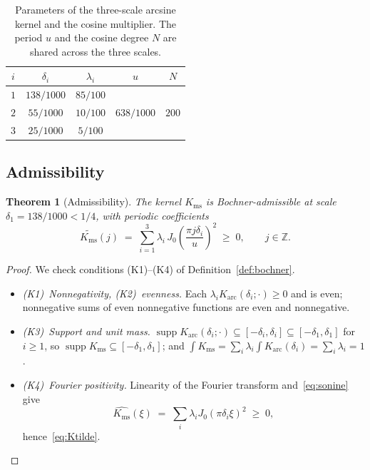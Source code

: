 \documentclass[11pt, letterpaper]{article}
\theoremstyle{paperplain}
\newtheorem{theorem}{Theorem}[section]
\theoremstyle{paperdef}
\newcommand{\Z}{\mathbb{Z}}
\newcommand{\supp}{\operatorname{supp}}
\newcommand{\Karc}{K_{\mathrm{arc}}}
\newcommand{\Kms}{K_{\mathrm{ms}}}
\begin{document}
\begin{table}[ht]
\centering
\begin{tabular}{ccccc}
  \toprule
  $i$ & $\delta_i$ & $\lambda_i$ & $u$ & $N$ \\
  \midrule
  $1$ & $138/1000$ & $85/100$ & \multirow{3}{*}{$638/1000$} & \multirow{3}{*}{$200$} \\
  $2$ & $55/1000$  & $10/100$ & & \\
  $3$ & $25/1000$  & $5/100$  & & \\
  \bottomrule
\end{tabular}
\caption[Parameters of the three-scale arcsine kernel and the cosine multiplier.]{Parameters of the three-scale arcsine kernel and the cosine
multiplier.  The period $u$ and the cosine degree $N$ are shared
across the three scales.}
\label{tab:kernel-params}
\end{table}

\subsection{Admissibility}\label{subsec:kernel-admissibility}

\begin{theorem}[Admissibility]
\label{thm:admissibility}
The kernel $\Kms$ is Bochner-admissible at scale
$\delta_1=138/1000<1/4$, with periodic coefficients
\begin{equation}\label{eq:Ktilde}
  \widetilde{\Kms}(j)
  \;=\;
  \sum_{i=1}^{3}\lambda_i\,
       J_0\!\left(\frac{\pi j\delta_i}{u}\right)^{\!2}
  \;\ge\; 0,
  \qquad j\in\Z.
\end{equation}
\end{theorem}

\begin{proof}
We check conditions (K1)--(K4) of Definition~\ref{def:bochner}.
\begin{itemize}[leftmargin=2em]
\item \emph{(K1)~Nonnegativity, (K2)~evenness.}  Each
  $\lambda_i\Karc(\delta_i;\cdot)\ge 0$ and is even; nonnegative sums
  of even nonnegative functions are even and nonnegative.
\item \emph{(K3)~Support and unit mass.}
  $\supp\Karc(\delta_i;\cdot)\subseteq
  [-\delta_i,\delta_i]\subseteq[-\delta_1,\delta_1]$ for $i\ge 1$, so
  $\supp\Kms\subseteq[-\delta_1,\delta_1]$; and
  $\int\Kms=\sum_i\lambda_i\int\Karc(\delta_i)=\sum_i\lambda_i=1$.
\item \emph{(K4)~Fourier positivity.}  Linearity of the Fourier
  transform and~\eqref{eq:sonine} give
  \[
    \widehat{\Kms}(\xi)
    \;=\;
    \sum_i\lambda_i J_0(\pi\delta_i\xi)^2 \;\ge\; 0,
  \]
  hence~\eqref{eq:Ktilde}.\qedhere
\end{itemize}
\end{proof}
\end{document}
